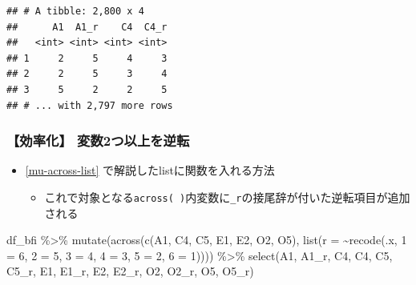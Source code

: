 \documentclass[
  xelatex,ja=standard, b5paper]{bxjsbook}
\newenvironment{Shaded}{\begin{snugshade}}{\end{snugshade}}
\newcommand{\AttributeTok}[1]{\textcolor[rgb]{0.77,0.63,0.00}{#1}}
\newcommand{\DecValTok}[1]{\textcolor[rgb]{0.00,0.00,0.81}{#1}}
\newcommand{\FunctionTok}[1]{\textcolor[rgb]{0.00,0.00,0.00}{#1}}
\newcommand{\NormalTok}[1]{#1}
\newcommand{\OtherTok}[1]{\textcolor[rgb]{0.56,0.35,0.01}{#1}}
\newcommand{\SpecialCharTok}[1]{\textcolor[rgb]{0.00,0.00,0.00}{#1}}
\newcommand{\StringTok}[1]{\textcolor[rgb]{0.31,0.60,0.02}{#1}}
\providecommand{\tightlist}{%
  \setlength{\itemsep}{0pt}\setlength{\parskip}{0pt}}
\begin{document}
\begin{verbatim}
## # A tibble: 2,800 x 4
##      A1  A1_r    C4  C4_r
##   <int> <int> <int> <int>
## 1     2     5     4     3
## 2     2     5     3     4
## 3     5     2     2     5
## # ... with 2,797 more rows
\end{verbatim}

\hypertarget{mu-rev-recode2}{%
\subsubsection{【効率化】 変数2つ以上を逆転}\label{mu-rev-recode2}}

\begin{itemize}
\tightlist
\item
  \ref{mu-across-list} で解説したlistに関数を入れる方法

  \begin{itemize}
  \tightlist
  \item
    これで対象となる\texttt{across(\ )}内変数に\texttt{\_r}の接尾辞が付いた逆転項目が追加される
  \end{itemize}
\end{itemize}

\begin{Shaded}
\begin{Highlighting}[]
\NormalTok{df\_bfi }\SpecialCharTok{\%\textgreater{}\%} 
  \FunctionTok{mutate}\NormalTok{(}\FunctionTok{across}\NormalTok{(}\FunctionTok{c}\NormalTok{(A1, C4, C5, E1, E2, O2, O5),}
                \FunctionTok{list}\NormalTok{(}\AttributeTok{r =} \SpecialCharTok{\textasciitilde{}}\FunctionTok{recode}\NormalTok{(.x, }\StringTok{\textasciigrave{}}\AttributeTok{1}\StringTok{\textasciigrave{}} \OtherTok{=} \DecValTok{6}\NormalTok{, }\StringTok{\textasciigrave{}}\AttributeTok{2}\StringTok{\textasciigrave{}} \OtherTok{=} \DecValTok{5}\NormalTok{, }\StringTok{\textasciigrave{}}\AttributeTok{3}\StringTok{\textasciigrave{}} \OtherTok{=} \DecValTok{4}\NormalTok{, }
                                 \StringTok{\textasciigrave{}}\AttributeTok{4}\StringTok{\textasciigrave{}} \OtherTok{=} \DecValTok{3}\NormalTok{, }\StringTok{\textasciigrave{}}\AttributeTok{5}\StringTok{\textasciigrave{}} \OtherTok{=} \DecValTok{2}\NormalTok{, }\StringTok{\textasciigrave{}}\AttributeTok{6}\StringTok{\textasciigrave{}} \OtherTok{=} \DecValTok{1}\NormalTok{)))) }\SpecialCharTok{\%\textgreater{}\%} 
  \FunctionTok{select}\NormalTok{(A1, A1\_r, C4,  C4, C5, C5\_r, E1, E1\_r, E2, E2\_r, O2, O2\_r, O5, O5\_r)}
\end{Highlighting}
\end{Shaded}
\end{document}
